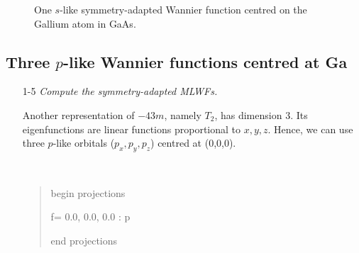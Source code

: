 	\begin{figure}[h!]
	\centering
	\centering
	\caption{One $s$-like symmetry-adapted Wannier function centred on the Gallium atom in GaAs.}\label{fig21.1}
	\end{figure}
\clearpage

\subsection*{Three $p$-like Wannier functions centred at Ga}
\begin{itemize}
	\item[1-5] {\it  Compute the symmetry-adapted MLWFs.}

    Another representation of ${-}43m$, namely $T_2$, has dimension 3. Its eigenfunctions are linear functions proportional to $x,y,z$. Hence, we can use three $p$-like orbitals ($p_x,p_y,p_z$) centred at (0,0,0).
	{\tt
	\begin{quote}
	begin projections

	f= 0.0, 0.0, 0.0 : p

	end projections
	\end{quote}
	}


\end{itemize}

